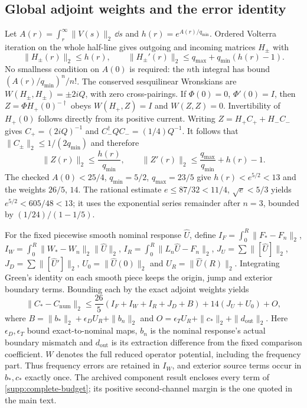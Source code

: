 \subsection{Global adjoint weights and the error identity}
Let $A(r)=\int_r^\infty\|V(s)\|_2\,\dd s$ and
$h(r)=e^{A(r)/q_{\min}}$. Ordered Volterra iteration on the whole
half-line gives outgoing and incoming matrices $H_\pm$ with
\begin{equation}
 \|H_\pm(r)\|_2\leq h(r),\qquad
 \|H_\pm'(r)\|_2\leq q_{\max}+q_{\min}(h(r)-1).
\end{equation}
No smallness condition on $A(0)$ is required: the $n$th integral has
bound $(A(r)/q_{\min})^n/n!$. The conserved sesquilinear Wronskians are
$W(H_\pm,H_\pm)=\pm2iQ$, with zero cross-pairings. If
$\Phi(0)=0$, $\Phi'(0)=I$, then
$Z=\Phi H_+(0)^{-\dagger}$ obeys $W(H_+,Z)=I$ and $W(Z,Z)=0$.
Invertibility of $H_+(0)$ follows directly from its positive current.
Writing $Z=H_+C_++H_-C_-$ gives
$C_+=(2iQ)^{-1}$ and $C_-^\dagger QC_-=(1/4)Q^{-1}$.
It follows that $\|C_\pm\|_2\leq1/(2q_{\min})$ and therefore
\begin{equation}
 \|Z(r)\|_2\leq\frac{h(r)}{q_{\min}},\qquad
 \|Z'(r)\|_2\leq\frac{q_{\max}}{q_{\min}}+h(r)-1.
\end{equation}
The checked $A(0)<25/4$, $q_{\min}=5/2$, $q_{\max}=23/5$ give
$h(r)<e^{5/2}<13$ and the weights $26/5$, $14$. The rational estimate
$e\leq87/32<11/4$, $\sqrt e<5/3$ yields
$e^{5/2}<605/48<13$; it uses the exponential series remainder after
$n=3$, bounded by $(1/24)/(1-1/5)$.

For the fixed piecewise smooth nominal response $\widehat U$, define
$ I_F=\int_0^R\|F_*-F_n\|_2$, $I_W=\int_0^R\|W_*-W_n\|_2\|\widehat U\|_2$,
$I_R=\int_0^R\|L_n\widehat U-F_n\|_2$,
$J_U=\sum\|[\widehat U]\|_2$, $J_D=\sum\|[\widehat U']\|_2$,
$U_0=\|\widehat U(0)\|_2$ and $U_R=\|\widehat U(R)\|_2$.
Integrating Green's identity on each smooth piece keeps the origin,
jump and exterior boundary terms. Bounding each by the exact adjoint
weights yields
\begin{equation}
 \|C_*-C_{\mathrm{num}}\|_2
 \leq\frac{26}{5}(I_F+I_W+I_R+J_D+B)+14(J_U+U_0)+O,
 \label{supp:complete-budget}
\end{equation}
where
$B=\|b_*\|_2+\epsilon_DU_R+\|b_n\|_2$ and
$O=\epsilon_TU_R+\|c_*\|_2+\|d_{\mathrm{out}}\|_2$.
Here $\epsilon_D,\epsilon_T$ bound exact-to-nominal maps, $b_n$ is
the nominal response's actual boundary mismatch and $d_{\mathrm{out}}$
is its extraction difference from the fixed comparison coefficient.
$W$ denotes the full reduced operator potential, including the
frequency part. Thus frequency errors are retained in $I_W$, and
exterior source terms occur in $b_*,c_*$ exactly once. The archived
component result encloses every term of \eqref{supp:complete-budget};
its positive second-channel margin is the one quoted in the main text.

